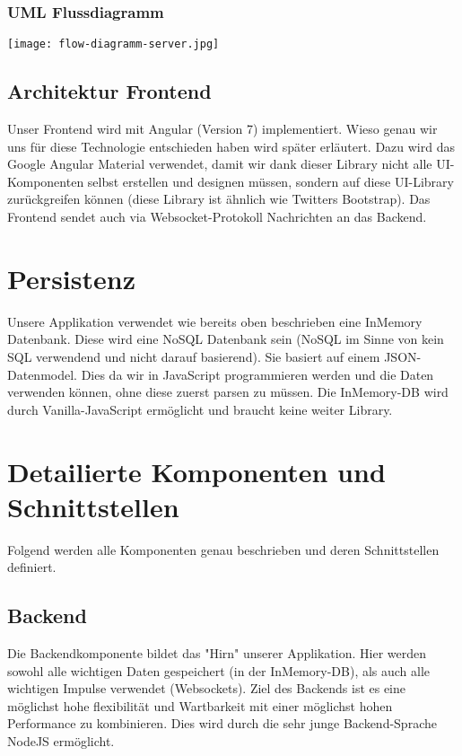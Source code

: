 	\subsubsection{UML Flussdiagramm}
	\texttt{[image: flow-diagramm-server.jpg]}

	\subsection{Architektur Frontend}
	Unser Frontend wird mit Angular (Version 7) implementiert. Wieso genau wir uns für diese Technologie entschieden haben wird später erläutert. Dazu wird das Google Angular Material verwendet, damit wir dank dieser Library nicht alle UI-Komponenten selbst erstellen und designen müssen, sondern auf diese UI-Library zurückgreifen können (diese Library ist ähnlich wie Twitters Bootstrap). Das Frontend sendet auch via Websocket-Protokoll Nachrichten an das Backend.

	\section{Persistenz}
	Unsere Applikation verwendet wie bereits oben beschrieben eine InMemory Datenbank. Diese wird eine NoSQL Datenbank sein (NoSQL im Sinne von kein SQL verwendend und nicht darauf basierend). Sie basiert auf einem JSON-Datenmodel. Dies da wir in JavaScript programmieren werden und die Daten verwenden können, ohne diese zuerst parsen zu müssen. Die InMemory-DB wird durch Vanilla-JavaScript ermöglicht und braucht keine weiter Library.

	\section{Detailierte Komponenten und Schnittstellen}
	Folgend werden alle Komponenten genau beschrieben und deren Schnittstellen definiert.

	\subsection{Backend}
	Die Backendkomponente bildet das "Hirn" unserer Applikation. Hier werden sowohl alle wichtigen Daten gespeichert (in der InMemory-DB), als auch alle wichtigen Impulse verwendet (Websockets). Ziel des Backends ist es eine möglichst hohe flexibilität und Wartbarkeit mit einer möglichst hohen Performance zu kombinieren. Dies wird durch die sehr junge Backend-Sprache NodeJS ermöglicht.

